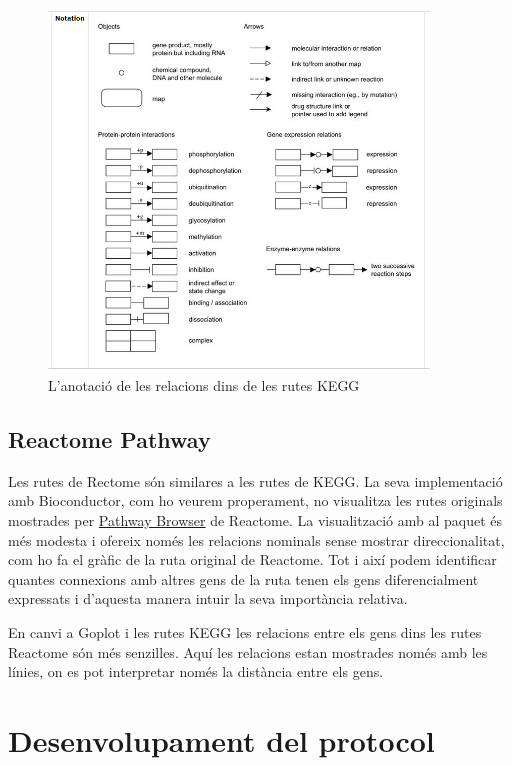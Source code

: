 \begin{figure}[H]
\centering
\includegraphics[width=0.9\textwidth]{figures/Annotation_KEGG.jpg} 
\caption{L'anotació de les relacions dins de les rutes \gls{KEGG}}
\end{figure}

\subsection{Reactome Pathway}

Les rutes de Rectome són similares a les rutes de \gls{KEGG}. La seva implementació amb \gls{Bioconductor}, com ho veurem properament, no visualitza les rutes originals mostrades per \href{https://reactome.org/PathwayBrowser/}{Pathway Browser} de Reactome. La visualització amb al paquet  és més modesta i ofereix només les relacions nominals sense mostrar direccionalitat, com ho fa el gràfic de la ruta original de Reactome. Tot i així podem identificar quantes connexions amb altres gens de la ruta tenen els gens diferencialment expressats i d'aquesta manera intuir la seva importància relativa. 

En canvi a Goplot i les rutes \gls{KEGG} les relacions entre els gens dins les rutes Reactome són més senzilles. Aquí les relacions estan mostrades només amb les línies, on es pot interpretar només la distància entre els gens. 

\section{Desenvolupament del protocol}

